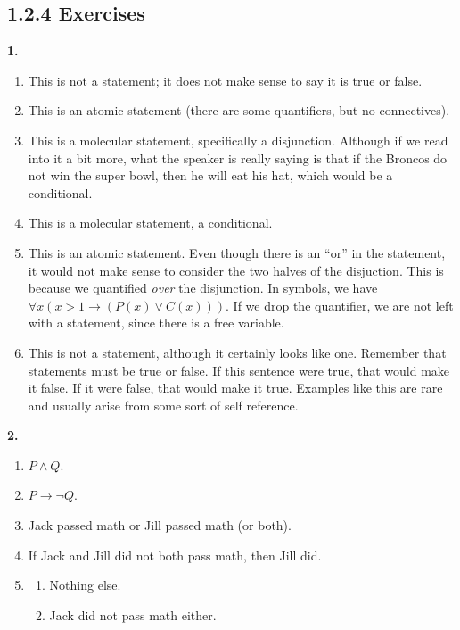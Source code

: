 \documentclass[10pt,]{book}
\theoremstyle{plain}
\theoremstyle{definition}
\theoremstyle{definition}
\theoremstyle{definition}
\numberwithin{equation}{section}
\def\imp{\rightarrow}
\begin{document}
\subsection*{1.2.4 Exercises}
\noindent\textbf{1.}\quad{}\leavevmode%
\begin{enumerate}[label=(\alph*)]
\item\hypertarget{li-67}{}This is not a statement; it does not make sense to say it is true or false.\item\hypertarget{li-68}{}This is an atomic statement (there are some quantifiers, but no connectives).\item\hypertarget{li-69}{}This is a molecular statement, specifically a disjunction.  Although if we read into it a bit more, what the speaker is really saying is that if the Broncos do not win the super bowl, then he will eat his hat, which would be a conditional.\item\hypertarget{li-70}{}This is a molecular statement, a conditional.\item\hypertarget{li-71}{}This is an atomic statement.  Even though there is an ``or'' in the statement, it would not make sense to consider the two halves of the disjuction.  This is because we quantified \emph{over} the disjunction.  In symbols, we have \(\forall x (x > 1 \imp (P(x) \vee C(x)))\).  If we drop the quantifier, we are not left with a statement, since there is a free variable.\item\hypertarget{li-72}{}This is not a statement, although it certainly looks like one.  Remember that statements must be true or false.  If this sentence were true, that would make it false.  If it were false, that would make it true.  Examples like this are rare and usually arise from some sort of self reference.\end{enumerate}
\par\smallskip
\noindent\textbf{2.}\quad{}\leavevmode%
\begin{enumerate}[label=(\alph*)]
\item\hypertarget{li-80}{}\(P \wedge Q\).\item\hypertarget{li-81}{}\(P \imp \neg Q\).\item\hypertarget{li-82}{}
    Jack passed math or Jill passed math (or both).
\item\hypertarget{li-83}{}
    If Jack and Jill did not both pass math, then Jill did.
\item\hypertarget{li-84}{}
    \begin{enumerate}[label=\roman*.]
\item\hypertarget{li-85}{} Nothing else. \item\hypertarget{li-86}{} Jack did not pass math either.\end{enumerate}

\end{enumerate}
\end{document}
